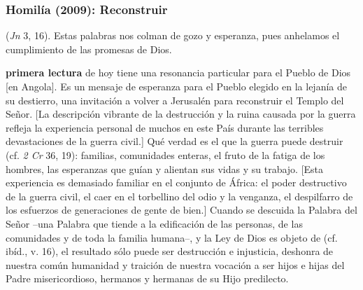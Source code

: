 \newpage

\subsubsection{Homilía (2009): Reconstruir}


\begin{body}
 (\textit{Jn} 3, 16). Estas palabras nos colman de gozo y esperanza, pues anhelamos el cumplimiento de las promesas de Dios. 


 \textbf{primera lectura} de hoy tiene una resonancia particular para el Pueblo de Dios [en Angola]. Es un mensaje de esperanza para el Pueblo elegido en la lejanía de su destierro, una invitación a volver a Jerusalén para reconstruir el Templo del Señor. [La descripción vibrante de la destrucción y la ruina causada por la guerra refleja la experiencia personal de muchos en este País durante las terribles devastaciones de la guerra civil.] Qué verdad es el que la guerra puede destruir  (cf. \textit{2 Cr} 36, 19): familias, comunidades enteras, el fruto de la fatiga de los hombres, las esperanzas que guían y alientan sus vidas y su trabajo. [Esta experiencia es demasiado familiar en el conjunto de África: el poder destructivo de la guerra civil, el caer en el torbellino del odio y la venganza, el despilfarro de los esfuerzos de generaciones de gente de bien.] Cuando se descuida la Palabra del Señor –una Palabra que tiende a la edificación de las personas, de las comunidades y de toda la familia humana–, y la Ley de Dios es objeto de  (cf. ibíd., v. 16), el resultado sólo puede ser destrucción e injusticia, deshonra de nuestra común humanidad y traición de nuestra vocación a ser hijos e hijas del Padre misericordioso, hermanos y hermanas de su Hijo predilecto.


\end{body}

